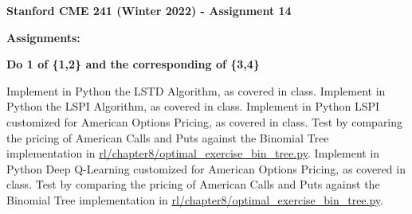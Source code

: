 \documentclass[12pt]{exam}
\begin{document}
\begin{center}
{\large {\bf Stanford CME 241 (Winter 2022) - Assignment 14}}
\end{center}
 
{\large{\bf Assignments:}}

{\bf Do 1 of \{1,2\} and the corresponding of \{3,4\}}

\begin{questions}

\question Implement in Python the LSTD Algorithm, as covered in class.
\question Implement in Python the LSPI Algorithm, as covered in class.
\question Implement in Python LSPI customized for American Options Pricing, as covered in class. Test by comparing the pricing of American Calls and Puts against the Binomial Tree implementation in \href{https://github.com/TikhonJelvis/RL-book/blob/master/rl/chapter8/optimal_exercise_bin_tree.py}{rl\//chapter8\//optimal\_exercise\_bin\_tree.py}.
\question Implement in Python Deep Q-Learning customized for American Options Pricing, as covered in class. Test by comparing the pricing of American Calls and Puts against the Binomial Tree implementation in \href{https://github.com/TikhonJelvis/RL-book/blob/master/rl/chapter8/optimal_exercise_bin_tree.py}{rl\//chapter8\//optimal\_exercise\_bin\_tree.py}.

\end{questions}
\end{document}
